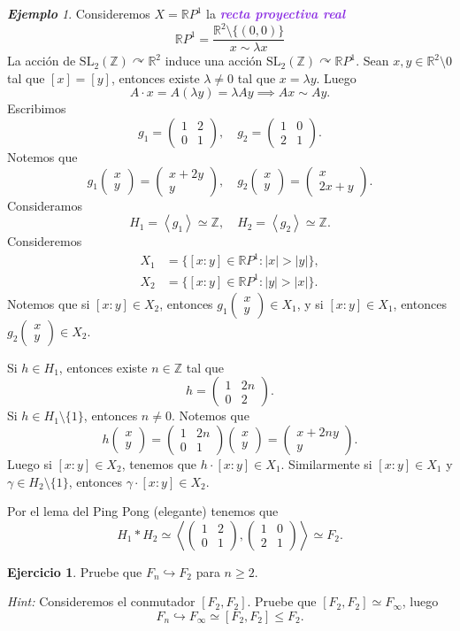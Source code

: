 \documentclass{article}
\theoremstyle{definition}
\newtheorem{exercise}{Ejercicio}
\theoremstyle{remark}
\newtheorem{example}[theorem]{\textbf{Ejemplo}}
\numberwithin{equation}{section}
\newcommand{\R}{\mathbb{R}}
\newcommand{\Z}{\mathbb{Z}}
\newcommand{\lam}{\lambda}
\newcommand{\oo}{\infty}
\newcommand{\embed}{\hookrightarrow}
\newcommand{\acts}{\curvearrowright}
\renewcommand{\c}{\cdot}
\newcommand{\SL}{\mathrm{SL}}
\newcommand{\abs}[1]{\left| #1 \right|}
\newcommand{\gen}[1]{\left\langle #1 \right\rangle}
\newcommand{\matr}[1]{\begin{pmatrix}#1\end{pmatrix}}
\newcommand{\wea}[1]{\textcolor{BlueViolet}{\textbf{\emph{#1}}}}
\begin{document}
\begin{example}
  Consideremos $X = \R P^1$ la \wea{recta proyectiva real}
  \[\R P^1 = \frac{\R^2 \setminus \{(0,0)\}}{x \sim \lam x}\]
  La acción de $\SL_2(\Z) \acts \R^2$ induce una acción $\SL_2(\Z) \acts \R P^1$. Sean $x,y \in \R^2 \setminus 0$ tal que $[x] = [y]$, entonces existe $\lam \neq 0$ tal que $x = \lam y$. Luego
  \[A \c x = A(\lam y) = \lam A y \implies Ax \sim Ay.\]
  Escribimos
  \[g_1 = \matr{1 & 2 \\ 0 & 1}, \quad g_2 = \matr{1 & 0 \\ 2 & 1}.\]
  Notemos que
  \[g_1 \matr{x \\ y} = \matr{x+2y \\ y}, \quad
  g_2 \matr{x \\ y} = \matr{x \\ 2x+y}.\]
  Consideramos
  \[H_1 = \gen{g_1} \simeq \Z, \quad
  H_2 = \gen{g_2} \simeq \Z.\]
  Consideremos
  \begin{align*}
    X_1 &= \{[x:y] \in \R P^1 \colon \abs x > \abs y\}, \\
    X_2 &= \{[x:y] \in \R P^1 \colon \abs y > \abs x\}.
  \end{align*}
  Notemos que si $[x:y] \in X_2$, entonces $g_1 \matr{x\\y} \in X_1$, y si $[x:y] \in X_1$, entonces $g_2 \matr{x\\y} \in X_2$.

  Si $h \in H_1$, entonces existe $n \in \Z$ tal que
  \[h = \matr{1 & 2n \\ 0 & 2}.\]
  Si $h \in H_1 \setminus \{1\}$, entonces $n \neq 0$. Notemos que
  \[h \matr{x\\y} = \matr{1 & 2n \\ 0 & 1} \matr{x\\y} = \matr{x + 2ny \\ y}.\]
  Luego si $[x:y] \in X_2$, tenemos que $h \c [x:y] \in X_1$. Similarmente si $[x:y] \in X_1$ y $\gamma \in H_2 \setminus \{1\}$, entonces $\gamma \c [x:y] \in X_2$.
  
  Por el lema del Ping Pong (elegante) tenemos que
  \[H_1 * H_2 \simeq \gen{\matr{1 & 2 \\ 0 & 1}, \matr{1 & 0 \\ 2 & 1}} \simeq F_2.\]
\end{example}

\begin{exercise}
  Pruebe que $F_n \embed F_2$ para $n \geq 2$.

  \emph{Hint:} Consideremos el conmutador $[F_2,F_2]$. Pruebe que $[F_2,F_2] \simeq F_\oo$, luego
  \[F_n \embed F_\oo \simeq [F_2,F_2] \leqslant F_2.\]
\end{exercise}
\end{document}
